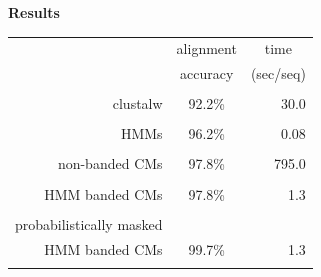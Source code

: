 \documentclass[landscape]{slides}
\begin{document}
\begin{slide}
\begin{center}
\large
\textbf{Results}
\end{center}
\medskip
\medskip
\begin{center}

\begin{tabular}{rcr} 
& \multicolumn{1}{c}{alignment} & \multicolumn{1}{c}{time} \\
& \multicolumn{1}{c}{accuracy} & \multicolumn{1}{c}{(sec/seq)} \\ \hline
& \multicolumn{1}{c}{} & \multicolumn{1}{c}{} \\
clustalw & 92.2\% & 30.0 \\ 
& \multicolumn{1}{c}{} & \multicolumn{1}{c}{} \\
HMMs & 96.2\% & 0.08 \\ 
& \multicolumn{1}{c}{} & \multicolumn{1}{c}{} \\
non-banded CMs & 97.8\% & 795.0 \\ 
& \multicolumn{1}{c}{} & \multicolumn{1}{c}{} \\
HMM banded CMs & 97.8\% & 1.3 \\ %
& \multicolumn{1}{c}{} & \multicolumn{1}{c}{} \\
probabilistically masked & & \\
HMM banded CMs           & 99.7\% & 1.3 \\ %
& \multicolumn{1}{c}{} & \multicolumn{1}{c}{} \\
\end{tabular}
\end{center}

\vfill
\end{slide}
\end{document}
